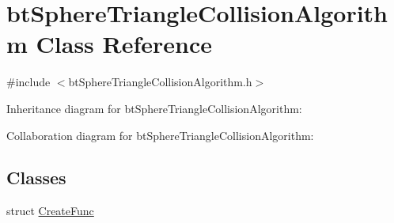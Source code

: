 \hypertarget{classbt_sphere_triangle_collision_algorithm}{\section{bt\+Sphere\+Triangle\+Collision\+Algorithm Class Reference}
\label{classbt_sphere_triangle_collision_algorithm}
}


{\ttfamily \#include $<$bt\+Sphere\+Triangle\+Collision\+Algorithm.\+h$>$}



Inheritance diagram for bt\+Sphere\+Triangle\+Collision\+Algorithm\+:


Collaboration diagram for bt\+Sphere\+Triangle\+Collision\+Algorithm\+:
\subsection*{Classes}
\begin{DoxyCompactItemize}
\item 
struct \hyperlink{structbt_sphere_triangle_collision_algorithm_1_1_create_func}{Create\+Func}
\end{DoxyCompactItemize}
